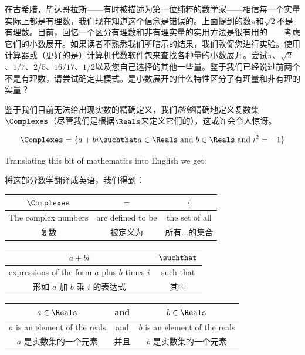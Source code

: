 在古希腊，毕达哥拉斯——有时被描述为第一位纯粹的数学家——相信每一个实量实际上都是有理数，我们现在知道这个信念是错误的。上面提到的数$\pi$和$\sqrt{2}$不是有理数。目前，回忆一个区分有理数和非有理实量的实用方法是很有用的——考虑它们的小数展开。如果读者不熟悉我们所暗示的结果，我们敦促您进行实验。使用计算器或（更好的是）计算机代数软件包来查找各种量的小数展开。尝试$\pi$、$\sqrt{2}$、$1/7$、$2/5$、$16/17$、$1/2$以及您自己选择的其他一些量。鉴于我们已经说过前两个不是有理数，请尝试确定其模式。是小数展开的什么特性区分了有理量和非有理的实量？

鉴于我们目前无法给出现实数的精确定义，我们{\em 能够}精确地定义复数集$\Complexes$（尽管我们是根据$\Reals$来定义它们的），这或许会令人惊讶。

\[ \Complexes = \{ a + bi \suchthat a \in \Reals \; \mbox{and} \; b \in
  \Reals \; \mbox{and} \; i^2 = -1 \} \]

Translating this bit of mathematics into English we get:

将这部分数学翻译成英语，我们得到：

\vspace{.2in}

\begin{tabular}{c|c|c}
  \rule[-10pt]{0pt}{22pt} $\Complexes$       & $=$               & $\{$           \\ \hline
  \rule[-6pt]{0pt}{22pt} The complex numbers & are defined to be & the set of all \\
  \rule[-6pt]{0pt}{22pt} 复数                & 被定义为          & 所有...的集合  \\
\end{tabular}

\vspace{.2in}

\begin{tabular}{c|c}
  \rule[-10pt]{0pt}{22pt} $a+bi$                                        & $\suchthat$ \\ \hline
  \rule[-6pt]{0pt}{22pt} expressions of the form $a$ plus $b$ times $i$ & such that   \\
  \rule[-6pt]{0pt}{22pt} 形如 $a$ 加 $b$ 乘 $i$ 的表达式                & 其中        \\
\end{tabular}

\vspace{.2in}

\begin{tabular}{c|c|c}
  \rule[-10pt]{0pt}{22pt} $a \in \Reals$                & and  & $b \in \Reals$         \\ \hline
  \rule[-6pt]{0pt}{22pt} $a$ is an element of the reals & and  & $b$ is an
  element of the reals                                                                  \\
  \rule[-6pt]{0pt}{22pt} $a$ 是实数集的一个元素         & 并且 & $b$ 是实数集的一个元素 \\
\end{tabular}

